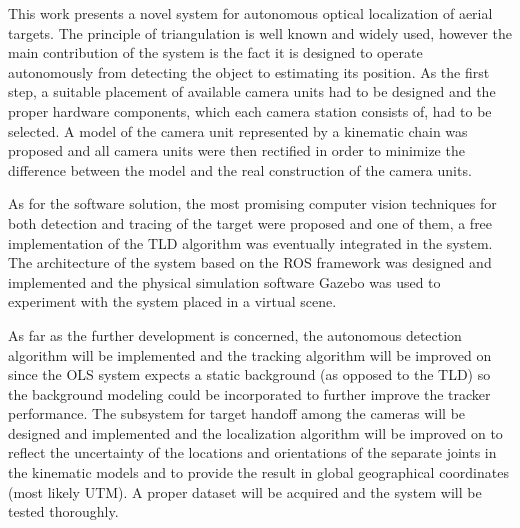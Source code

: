 

This work presents a novel system for autonomous optical localization of aerial targets. The principle of triangulation is well known and widely used, however the main contribution of the system is the fact it is designed to operate autonomously from detecting the object to estimating its position. As the first step, a suitable placement of available camera units had to be designed and the proper hardware components, which each camera station consists of, had to be selected. A model of the camera unit represented by a kinematic chain was proposed and all camera units were then rectified in order to minimize the difference between the model and the real construction of the camera units.

As for the software solution, the most promising computer vision techniques for both detection and tracing of the target were proposed and one of them, a free implementation of the TLD algorithm was eventually integrated in the system. The architecture of the system based on the ROS framework was designed and implemented and the physical simulation software Gazebo was used to experiment with the system placed in a virtual scene.

As far as the further development is concerned, the autonomous detection algorithm will be implemented and the tracking algorithm will be improved on since the OLS system expects a static background (as opposed to the TLD) so the background modeling could be incorporated to further improve the tracker performance. The subsystem for target handoff among the cameras will be designed and implemented and the localization algorithm will be improved on to reflect the uncertainty of the locations and orientations of the separate joints in the kinematic models and to provide the result in global geographical coordinates (most likely UTM). A proper dataset will be acquired and the system will be tested thoroughly.

\vata[5]